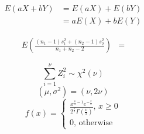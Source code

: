 \documentclass[a4paper]{article}
\begin{document}
\[\begin{aligned}
    E(aX+bY)&=E(aX)+E(bY)\\
    &=aE(X)+bE(Y)
\end{aligned}\]

\[\begin{aligned}
    E\left(\frac{(n_1-1)s_1^2+(n_2-1)s_2^2}{n_1+n_2-2}\right)
    &=
\end{aligned}\]

\[\sum_{i=1}^\nu Z_i^2\sim\chi^2(\nu)\]
\[(\mu,\sigma^2)=(\nu,2\nu)\]
\[f(x)=
\begin{cases}
    \displaystyle\frac{x^{\frac\nu2-1}e^{-\frac x2}}{2^{\frac\nu2}\Gamma\left(\frac\nu2\right)},\,x\geqslant0\\
    0,\,\text{otherwise}
\end{cases}\]
\end{document}
